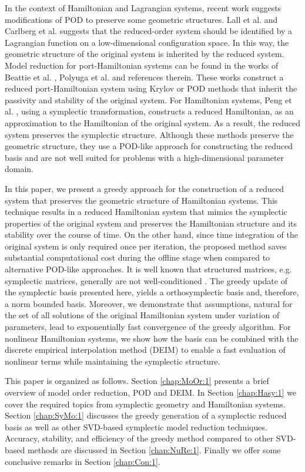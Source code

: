 In the context of Hamiltonian and Lagrangian systems, recent work suggests modifications of POD to preserve {\edit some} geometric structures. Lall et al. \cite{Lall:2003iy} and Carlberg et al. \cite{Carlberg:2014ky} suggests that the reduced-order system should be identified by a Lagrangian function on a low-dimensional configuration space. In this way, the geometric structure of the original system is inherited by the reduced system. {\edit Model reduction for port-Hamiltonian systems can be found in the works of Beattie et al. \cite{Chaturantabut:2016he}, Polyuga et al. \cite{Polyuga:2010gj} and references therein. These works construct a reduced port-Hamiltonian system using Krylov or POD methods that inherit the passivity and stability of the original system.} For Hamiltonian systems, Peng et al. \cite{Peng:2014di}, using a symplectic transformation, constructs a reduced Hamiltonian, as an approximation to the Hamiltonian of the original system. As a result, the reduced system preserves the symplectic structure. Although these methods preserve {\edit the} geometric structure, they use a POD-like approach for constructing the reduced basis and are not well {\edit suited} for problems with a high-dimensional parameter domain.

In this paper, we present a greedy approach for the construction of a reduced system that preserves the geometric structure of Hamiltonian systems. This technique results in a reduced Hamiltonian system that mimics the symplectic properties of the original system and preserves the Hamiltonian structure and its stability over the course of time. On the other hand, since time integration of the original system is only required once per iteration, the proposed method saves substantial computational cost during the offline stage when compared to alternative POD-like approaches. {\edit It is well known that structured matrices, e.g. symplectic matrices, generally are not well-conditioned \cite{Karow:2006cf}. The greedy update of the symplectic basis presented here, yields a orthosymplectic basis and, therefore, a norm bounded basis.} Moreover, we demonstrate that assumptions, natural for the set of all solutions of the original Hamiltonian system under variation of parameters, lead to exponentially fast convergence of the greedy algorithm. For nonlinear Hamiltonian systems, we show how the basis can be combined with the discrete empirical interpolation method (DEIM) {\edit \cite{Chaturantabut:2010cz,Barrault:2004kz}} to enable a fast evaluation of nonlinear terms while maintaining the symplectic structure.

This paper is organized as follows. Section \ref{chap:MoOr:1} presents a brief overview of model order reduction, POD and DEIM. In Section \ref{chap:Hasy:1} we cover the required topics from symplectic geometry and Hamiltonian systems. Section \ref{chap:SyMo:1} discusses the greedy generation of a symplectic reduced basis as well as other SVD-based symplectic model reduction techniques. Accuracy, stability, and efficiency of the greedy method compared to other SVD-based methods are discussed in Section \ref{chap:NuRe:1}. {\edit Finally we offer some conclusive remarks in Section \ref{chap:Con:1}}.
